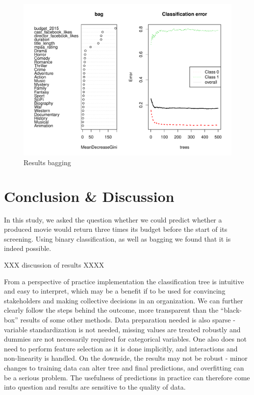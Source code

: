 \documentclass[
]{article}
\begin{document}
\begin{figure}

{\centering \includegraphics{./bagplots} 

}

\caption{Results bagging}\label{fig:unnamed-chunk-10}
\end{figure}

\hypertarget{conclusion-discussion}{%
\section{Conclusion \& Discussion}\label{conclusion-discussion}}

In this study, we asked the question whether we could predict whether a
produced movie would return three times its budget before the start of
its screening. Using binary classification, as well as bagging we found
that it is indeed possible.

XXX discussion of results XXXX

From a perspective of practice implementation the classification tree is
intuitive and easy to interpret, which may be a benefit if to be used
for convincing stakeholders and making collective decisions in an
organization. We can further clearly follow the steps behind the
outcome, more transparent than the ``black-box'' results of some other
methods. Data preparation needed is also sparse - variable
standardization is not needed, missing values are treated robustly and
dummies are not necessarily required for categorical variables. One also
does not need to perform feature selection as it is done implicitly, and
interactions and non-linearity is handled. On the downside, the results
may not be robust - minor changes to training data can alter tree and
final predictions, and overfitting can be a serious problem. The
usefulness of predictions in practice can therefore come into question
and results are sensitive to the quality of data.
\end{document}
